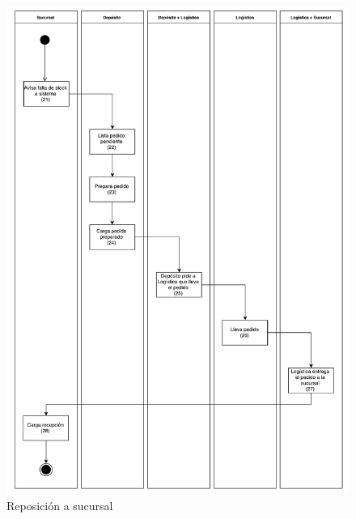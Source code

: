 \begin{figure}[H]
  \begin{center}
  \includegraphics[width=\textwidth]{tp2/images/actividad-reposicion-sucursal.pdf}
  \end{center}
  \caption{Reposición a sucursal}
\end{figure}
